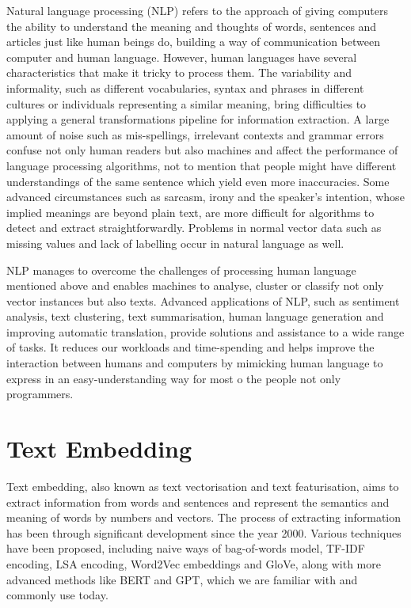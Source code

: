 Natural language processing (NLP) refers to the approach of giving computers the ability to understand the meaning and thoughts of words, sentences and articles just like human beings do, building a way of communication between computer and human language.
However, human languages have several characteristics that make it tricky to process them.
The variability and informality, such as different vocabularies, syntax and phrases in different cultures or individuals representing a similar meaning, bring difficulties to applying a general transformations pipeline for information extraction.
A large amount of noise such as mis-spellings, irrelevant contexts and grammar errors confuse not only human readers but also machines and affect the performance of language processing algorithms, not to mention that people might have different understandings of the same sentence which yield even more inaccuracies.
Some advanced circumstances such as sarcasm, irony and the speaker's intention, whose implied meanings are beyond plain text, are more difficult for algorithms to detect and extract straightforwardly. 
Problems in normal vector data such as missing values and lack of labelling occur in natural language as well.

NLP manages to overcome the challenges of processing human language mentioned above and enables machines to analyse, cluster or classify not only vector instances but also texts. 
Advanced applications of NLP, such as sentiment analysis, text clustering, text summarisation, human language generation and improving automatic translation, provide solutions and assistance to a wide range of tasks. 
It reduces our workloads and time-spending and helps improve the interaction between humans and computers by mimicking human language to express in an easy-understanding way for most o the people not only programmers.

\section{Text Embedding}
Text embedding, also known as text vectorisation and text featurisation, aims to extract information from words and sentences and represent the semantics and meaning of words by numbers and vectors.
The process of extracting information has been through significant development since the year 2000.
Various techniques have been proposed, including naive ways of bag-of-words model, TF-IDF encoding, LSA encoding, Word2Vec embeddings and GloVe, along with more advanced methods like BERT and GPT, which we are familiar with and commonly use today.

